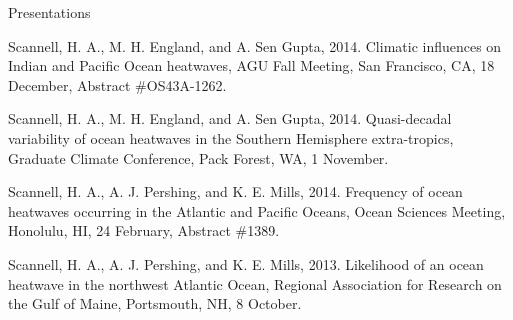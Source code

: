 \documentclass{resume} %
\begin{document}
\begin{rSection}{Presentations}
\begin{etaremune}
\item Scannell, H. A., M. H. England, and A. Sen Gupta, 2014. Climatic influences on Indian and Pacific Ocean heatwaves, AGU Fall Meeting, San Francisco, CA, 18 December, Abstract \#OS43A-1262.

\item Scannell, H. A., M. H. England, and A. Sen Gupta, 2014. Quasi-decadal variability of ocean heatwaves in the Southern Hemisphere extra-tropics, Graduate Climate Conference, Pack Forest, WA, 1 November.

\item Scannell, H. A., A. J. Pershing, and K. E. Mills, 2014. Frequency of ocean heatwaves occurring in the Atlantic and Pacific Oceans, Ocean Sciences Meeting, Honolulu, HI, 24 February, Abstract \#1389.

\item Scannell, H. A., A. J. Pershing, and K. E. Mills, 2013. Likelihood of an ocean heatwave in the northwest Atlantic Ocean, Regional Association for Research on the Gulf of Maine, Portsmouth, NH, 8 October.

\end{etaremune}


\end{rSection}





\end{document}
